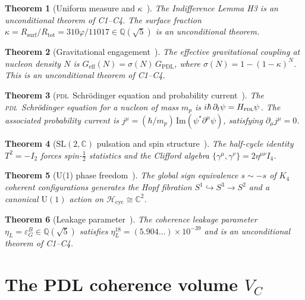 \documentclass[12pt,a4paper]{article}
\newtheorem{theorem}{Theorem}[section]
\newcommand{\Kfour}{K_4}
\newcommand{\hb}{\hbar}
\newcommand{\PDL}{\textsc{pdl}}
\newcommand{\sig}{\sigma}
\newcommand{\GPDL}{G_{\mathrm{PDL}}}
\newcommand{\Geff}{G_{\mathrm{eff}}}
\newcommand{\Rsurf}{R_{\mathrm{surf}}}
\newcommand{\Rtot}{R_{\mathrm{tot}}}
\newcommand{\etaL}{\eta_L}
\newcommand{\vp}{\varphi}
\begin{document}
\begin{theorem}[Uniform measure and $\kappa$~{\cite{PDL_D42_2026}}]
\label{thm:H3}
The Indifference Lemma H3 is an unconditional theorem of C1--C4. The surface fraction $\kappa = \Rsurf/\Rtot = 310\vp/11017 \in \mathbb{Q}(\sqrt{5})$ is an unconditional theorem.
\end{theorem}

\begin{theorem}[Gravitational engagement~{\cite{PDL_D24_2026,PDL_D42_2026}}]
\label{thm:sigma}
The effective gravitational coupling at nucleon density $N$ is $\Geff(N) = \sig(N)\,\GPDL$, where $\sig(N) = 1-(1-\kappa)^N$. This is an unconditional theorem of C1--C4.
\end{theorem}

\begin{theorem}[\PDL\ Schr\"odinger equation and probability current~{\cite{PDL_D32_2026}}]
\label{thm:D32}
The \PDL\ Schr\"odinger equation for a nucleon of mass $m_p$ is $i\hb\,\partial_t\psi = H_{\PDL}\psi$. The associated probability current is $j^\mu = (\hb/m_p)\,\mathrm{Im}(\psi^*\partial^\mu\psi)$, satisfying $\partial_\mu j^\mu = 0$.
\end{theorem}

\begin{theorem}[$\mathrm{SL}(2,\mathbb{C})$ pulsation and spin structure~{\cite{PDL_D33_2026}}]
\label{thm:D33}
The half-cycle identity $T^2 = -I_2$ forces spin-$\tfrac{1}{2}$ statistics and the Clifford algebra $\{\gamma^\mu,\gamma^\nu\} = 2\eta^{\mu\nu}I_4$.
\end{theorem}

\begin{theorem}[U(1) phase freedom~{\cite{PDL_D46_2026}}]
\label{thm:D46}
The global sign equivalence $s\sim -s$ of $\Kfour$ coherent configurations generates the Hopf fibration $S^1\hookrightarrow S^3\to S^2$ and a canonical $\mathrm{U}(1)$ action on $\mathcal{H}_{\mathrm{cyc}}\cong\mathbb{C}^2$.
\end{theorem}

\begin{theorem}[Leakage parameter~{\cite{PDL_D17_2026,PDL_D30_2026}}]
\label{thm:etaL}
The coherence leakage parameter $\etaL = \varepsilon_G^B \in \mathbb{Q}(\sqrt{5})$ satisfies $\etaL^{18} = (5.904\ldots)\times 10^{-39}$ and is an unconditional theorem of C1--C4.
\end{theorem}

\section{The PDL coherence volume \texorpdfstring{$V_C$}{VC}}
\label{sec:VC}
\end{document}
